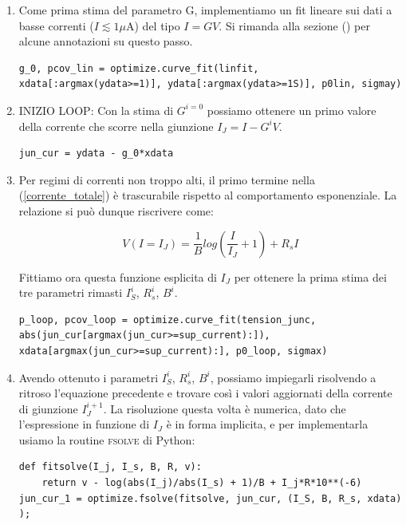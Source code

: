 \documentclass[a4paper]{article}
\begin{document}
\begin{enumerate}

\item Come prima stima del parametro G, implementiamo un fit lineare sui dati a basse correnti ($I \lesssim 1 \mu$A) del tipo $I = GV$. Si rimanda alla sezione () per alcune annotazioni su questo passo.

\begin{lstlisting}
g_0, pcov_lin = optimize.curve_fit(linfit, 
xdata[:argmax(ydata>=1)], ydata[:argmax(ydata>=1S)], p0lin, sigmay)
\end{lstlisting}

\item INIZIO LOOP: Con la stima di $G^{i=0}$ possiamo ottenere un primo valore della corrente che scorre nella giunzione $I_J = I - G^i V$.

\begin{lstlisting}
jun_cur = ydata - g_0*xdata
\end{lstlisting}

\item Per regimi di correnti non troppo alti, il primo termine nella (\ref{corrente_totale}) è trascurabile rispetto al comportamento esponenziale. La relazione si può dunque riscrivere come:

\begin{equation}
V(I=I_J) = \frac{1}{B} log \left(\frac{I}{I_J} + 1 \right) + R_s I
\end{equation}

Fittiamo ora questa funzione esplicita di $I_J$ per ottenere la prima stima dei tre parametri rimasti $I_S^i$, $R_s^i$, $B^i$.

\begin{lstlisting}
p_loop, pcov_loop = optimize.curve_fit(tension_junc, 
abs(jun_cur[argmax(jun_cur>=sup_current):]), 
xdata[argmax(jun_cur>=sup_current):], p0_loop, sigmax)
\end{lstlisting}


\item Avendo ottenuto i parametri $I_S^i$, $R_s^i$, $B^i$, possiamo impiegarli risolvendo a ritroso l'equazione precedente e trovare così i valori aggiornati della corrente di giunzione $I_{J}^{i+1}$. La risoluzione questa volta è numerica, dato che l'espressione in funzione di $I_J$ è in forma implicita, e per implementarla usiamo la routine \textsc{fsolve} di Python:

\begin{lstlisting}
def fitsolve(I_j, I_s, B, R, v):
    return v - log(abs(I_j)/abs(I_s) + 1)/B + I_j*R*10**(-6)
jun_cur_1 = optimize.fsolve(fitsolve, jun_cur, (I_S, B, R_s, xdata) );
\end{lstlisting}


\end{enumerate}
\end{document}
